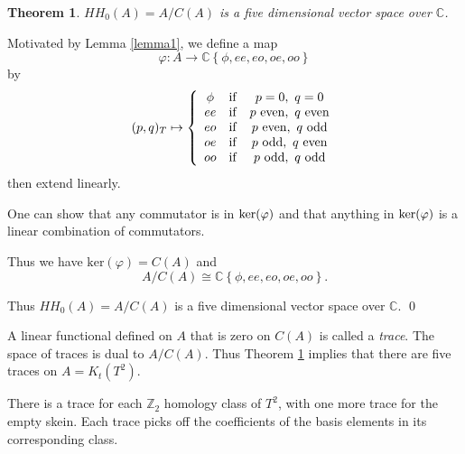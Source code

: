 \documentclass{slides}
\newtheorem{theorem}{Theorem}
\theoremstyle{definition}
\begin{document}
\begin{slide}
\begin{theorem}
$HH_0(A) = A/C(A)$ is a five dimensional
vector space over $\mathbb{C}$.
\label{five-dim}
\end{theorem}

\proof
Motivated by Lemma \ref{lemma1}, we define a map
$$\varphi \colon
A \to \mathbb{C} \left\{ \phi, ee, eo, oe, oo \right\}$$
by
$$(p,q)_T \mapsto \left\{
{\begin{array}{ccc}
\phi & {\rm if} & p=0,~q=0 \\
ee & {\rm if} & p~{\rm even},~q~{\rm even} \\
eo & {\rm if} & p~{\rm even},~q~{\rm odd} \\
oe & {\rm if} & p~{\rm odd},~q~{\rm even} \\
oo & {\rm if} & p~{\rm odd},~q~{\rm odd}
\end{array}}
\right.$$
then extend linearly.

One can show that any commutator is in ${\rm ker}(\varphi)$
and that anything in ${\rm ker}(\varphi)$ is a linear combination
of commutators.
\end{slide}

\begin{slide}

Thus we have $\mathrm{ker}(\varphi) = C(A)$ and
\[
A/C(A) \cong \mathbb{C} \left\{ \phi, ee, eo, oe, oo \right\}.
\]

Thus $HH_0 (A) = A/C(A)$ is a
five dimensional vector space over $\mathbb{C}$.
\qed

A linear functional defined on $A$ that is zero on $C(A)$ is
called a \textit{trace}.  The space of traces is dual to $A / C(A)$.
Thus Theorem \ref{five-dim} implies that there are five traces
on $A = K_t(T^2)$.

There is a trace for each $\mathbb{Z}_2$ homology class of
$T^2$, with one more trace for the empty skein.  Each trace picks off
the coefficients of the basis elements in its corresponding
class.
\end{slide}
\end{document}
